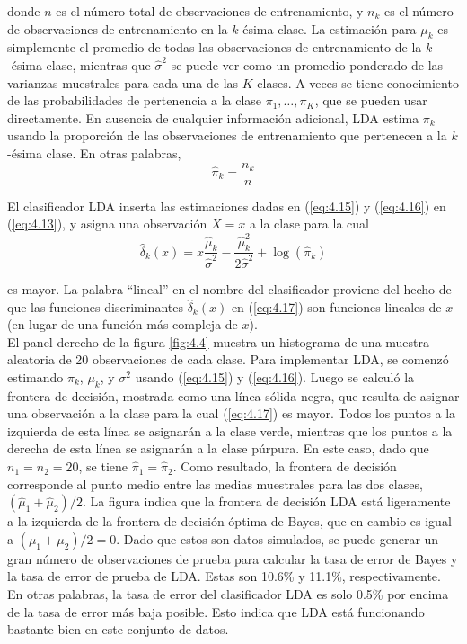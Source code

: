 donde $n$ es el número total de observaciones de entrenamiento, y $n_k$ es el número de observaciones de entrenamiento en la $k$-ésima clase. La estimación para $\mu_k$ es simplemente el promedio de todas las observaciones de entrenamiento de la $k$-ésima clase, mientras que $\hat{\sigma}^2$ se puede ver como un promedio ponderado de las varianzas muestrales para cada una de las $K$ clases. A veces se tiene conocimiento de las probabilidades de pertenencia a la clase $\pi_1, \ldots, \pi_K$, que se pueden usar directamente. En ausencia de cualquier información adicional, LDA estima $\pi_k$ usando la proporción de las observaciones de entrenamiento que pertenecen a la $k$-ésima clase. En otras palabras,
\begin{equation}
\hat{\pi}_k = \frac{n_k}{n}
\label{eq:4.16}
\end{equation}

El clasificador LDA inserta las estimaciones dadas en (\ref{eq:4.15}) y (\ref{eq:4.16}) en (\ref{eq:4.13}), y asigna una observación $X = x$ a la clase para la cual
\begin{equation}
\hat{\delta}_k(x) = x \frac{\hat{\mu}_k}{\hat{\sigma}^2} - \frac{\hat{\mu}_k^2}{2\hat{\sigma}^2} + \log(\hat{\pi}_k)
\label{eq:4.17}
\end{equation}

es mayor. La palabra ``lineal'' en el nombre del clasificador proviene del hecho de que las funciones discriminantes $\hat{\delta}_k(x)$ en (\ref{eq:4.17}) son funciones lineales de $x$ (en lugar de una función más compleja de $x$). \\

El panel derecho de la figura \ref{fig:4.4} muestra un histograma de una muestra aleatoria de 20 observaciones de cada clase. Para implementar LDA, se comenzó estimando $\pi_k$, $\mu_k$, y $\sigma^2$ usando (\ref{eq:4.15}) y (\ref{eq:4.16}). Luego se calculó la frontera de decisión, mostrada como una línea sólida negra, que resulta de asignar una observación a la clase para la cual (\ref{eq:4.17}) es mayor. Todos los puntos a la izquierda de esta línea se asignarán a la clase verde, mientras que los puntos a la derecha de esta línea se asignarán a la clase púrpura. En este caso, dado que $n_1 = n_2 = 20$, se tiene $\hat{\pi}_1 = \hat{\pi}_2$. Como resultado, la frontera de decisión corresponde al punto medio entre las medias muestrales para las dos clases, $(\hat{\mu}_1 + \hat{\mu}_2)/2$. La figura indica que la frontera de decisión LDA está ligeramente a la izquierda de la frontera de decisión óptima de Bayes, que en cambio es igual a $(\mu_1 + \mu_2)/2 = 0$. Dado que estos son datos simulados, se puede generar un gran número de observaciones de prueba para calcular la tasa de error de Bayes y la tasa de error de prueba de LDA. Estas son 10.6\% y 11.1\%, respectivamente. En otras palabras, la tasa de error del clasificador LDA es solo 0.5\% por encima de la tasa de error más baja posible. Esto indica que LDA está funcionando bastante bien en este conjunto de datos. \\


